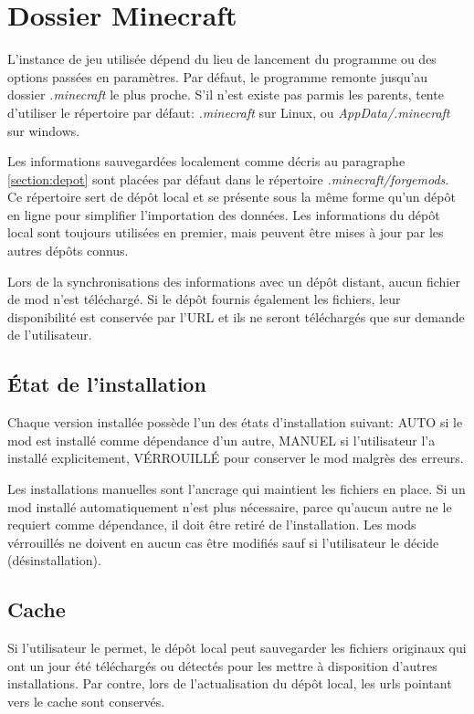 \documentclass{article}
\begin{document}
\section{Dossier Minecraft}
L'instance de jeu utilisée dépend du lieu de lancement du programme ou des options passées en paramètres.
Par défaut, le programme remonte jusqu'au dossier \textit{.minecraft} le plus proche.
S'il n'est existe pas parmis les parents, tente d'utiliser le répertoire par défaut: \textit{.minecraft} sur Linux, ou \textit{AppData/.minecraft} sur windows.

Les informations sauvegardées localement comme décris au paragraphe \ref{section:depot} sont placées par défaut dans le répertoire \textit{.minecraft/forgemods}.
Ce répertoire sert de dépôt local et se présente sous la même forme qu'un dépôt en ligne pour simplifier l'importation des données.
Les informations du dépôt local sont toujours utilisées en premier, mais peuvent être mises à jour par les autres dépôts connus.

Lors de la synchronisations des informations avec un dépôt distant, aucun fichier de mod n'est téléchargé.
Si le dépôt fournis également les fichiers, leur disponibilité est conservée par l'URL et ils ne seront téléchargés que sur demande de l'utilisateur.


\subsection{État de l'installation}
Chaque version installée possède l'un des états d'installation suivant: AUTO si le mod est installé comme dépendance d'un autre, MANUEL si l'utilisateur l'a installé explicitement, VÉRROUILLÉ pour conserver le mod malgrès des erreurs.

Les installations manuelles sont l'ancrage qui maintient les fichiers en place.
Si un mod installé automatiquement n'est plus nécessaire, parce qu'aucun autre ne le requiert comme dépendance, il doit être retiré de l'installation.
Les mods vérrouillés ne doivent en aucun cas être modifiés sauf si l'utilisateur le décide (désinstallation).

\subsection{Cache}
Si l'utilisateur le permet, le dépôt local peut sauvegarder les fichiers originaux qui ont un jour été téléchargés ou détectés pour les mettre à disposition d'autres installations.
Par contre, lors de l'actualisation du dépôt local, les urls pointant vers le cache sont conservés.
\end{document}
